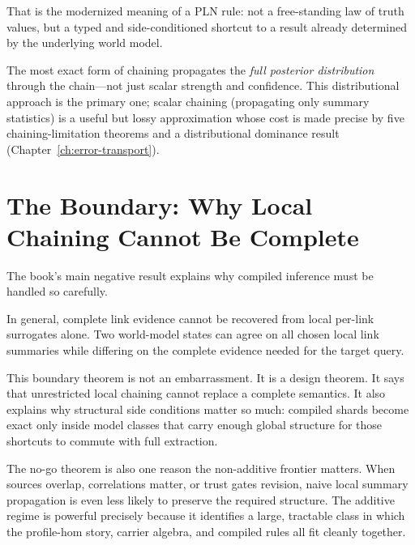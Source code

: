 
That is the modernized meaning of a PLN rule: not a free-standing law
of truth values, but a typed and side-conditioned shortcut to a result
already determined by the underlying world model.

The most exact form of chaining propagates the \emph{full posterior
distribution} through the chain---not just scalar strength and
confidence.  This distributional approach is the primary one; scalar
chaining (propagating only summary statistics) is a useful but lossy
approximation whose cost is made precise by five chaining-limitation
theorems and a distributional dominance result
(Chapter~\ref{ch:error-transport}).

\section{The Boundary: Why Local Chaining Cannot Be Complete}
\label{sec:overview-boundary}

The book's main negative result explains why compiled inference must be
handled so carefully.

\begin{theorem}
\label{thm:overview-no-go}
In general, complete link evidence cannot be recovered from local per-link
surrogates alone.  Two world-model states can agree on all chosen local link
summaries while differing on the complete evidence needed for the target
query.
\end{theorem}

This boundary theorem is not an embarrassment.  It is a design theorem.  It
says that unrestricted local chaining cannot replace a complete semantics.  It
also explains why structural side conditions matter so much: compiled shards
become exact only inside model classes that carry enough global structure for
those shortcuts to commute with full extraction.

The no-go theorem is also one reason the non-additive frontier matters.  When
sources overlap, correlations matter, or trust gates revision, naive local
summary propagation is even less likely to preserve the required structure.
The additive regime is powerful precisely because it identifies a large,
tractable class in which the profile-hom story, carrier algebra, and compiled
rules all fit cleanly together.


